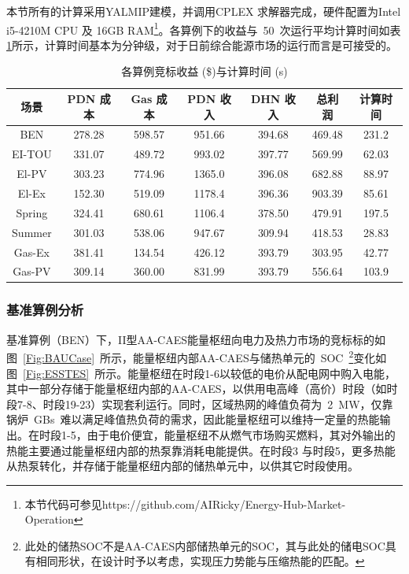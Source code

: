 本节所有的计算采用YALMIP\cite{YALMIP}建模，并调用CPLEX 求解器完成，硬件配置为Intel i5-4210M CPU 及 16GB RAM\footnote{本节代码可参见https://github.com/AIRicky/Energy-Hub-Market-Operation}。各算例下的收益与~50~次运行平均计算时间如表\ref{tab:Results}所示，计算时间基本为分钟级，对于日前综合能源市场的运行而言是可接受的。
\begin{table}[!htp]
\scriptsize
\renewcommand{\arraystretch}{1.3}
\renewcommand{\tabcolsep}{0.83em}
\caption{各算例竞标收益 (\$)与计算时间 (s)}
\centering
\begin{tabular}{ccccccc}
\toprule
{场景} & {PDN 成本} & {Gas 成本} & {PDN 收入} & {DHN 收入} & {总利润} & {计算时间}\\
\midrule
BEN      & 278.28 & 598.57   & 951.66   &  394.68  & 469.48  & 231.2\\
EI-TOU   & 331.07 & 489.72   & 993.02   &  397.77  & 569.99  & 62.03\\
El-PV    & 303.23 & 774.96   & 1365.0   &  396.08  & 682.88  & 88.97\\
El-Ex    & 152.30 & 519.09   & 1178.4   &  396.36  & 903.39  & 85.61\\
Spring   & 324.41 & 680.61   & 1106.4   &  378.50  & 479.91  & 197.5\\
Summer   & 301.03 & 538.06   & 947.67   &  309.94  & 418.53  & 28.83\\
Gas-Ex   & 381.41 & 134.54   & 426.12   &  393.79  & 303.95  & 42.77\\
Gas-PV   & 309.14 & 360.00   & 831.99   &  393.79  & 556.64  & 103.9\\
\bottomrule
\end{tabular}
\label{tab:Results}
\end{table}

\subsubsection{基准算例分析}

基准算例（BEN）下，II型AA-CAES能量枢纽向电力及热力市场的竞标标的如图~\ref{Fig:BAUCase}~所示，能量枢纽内部AA-CAES与储热单元的~SOC~\footnote{此处的储热SOC不是AA-CAES内部储热单元的SOC，其与此处的储电SOC具有相同形状，在设计时予以考虑，实现压力势能与压缩热能的匹配。}变化如图~\ref{Fig:ESSTES}~所示。能量枢纽在时段1-6以较低的电价从配电网中购入电能，其中一部分存储于能量枢纽内部的AA-CAES，以供用电高峰（高价）时段（如时段7-8、时段19-23）实现套利运行。同时，区域热网的峰值负荷为~2~MW，仅靠锅炉~GBs~难以满足峰值热负荷的需求，因此能量枢纽可以维持一定量的热能输出。在时段1-5，由于电价便宜，能量枢纽不从燃气市场购买燃料，其对外输出的热能主要通过能量枢纽内部的热泵靠消耗电能提供。在时段3 与时段5，更多热能从热泵转化，并存储于能量枢纽内部的储热单元中，以供其它时段使用。

